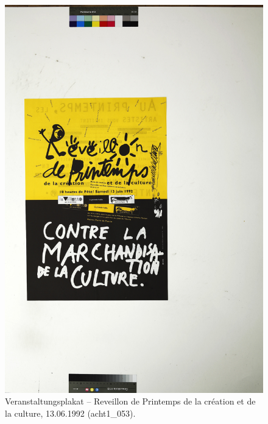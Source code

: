 \documentclass[a4paper,12pt,ngerman]{article}
\begin{document}
\newpage
\begin{figure}[ht]
\includegraphics[width=\linewidth]{Abbildung_43_(acht1_053)}
\centering
\caption{Veranstaltungsplakat -- Reveillon de Printemps de la création et de la culture, 13.06.1992 (acht1\_053).}
\end{figure}
\end{document}
